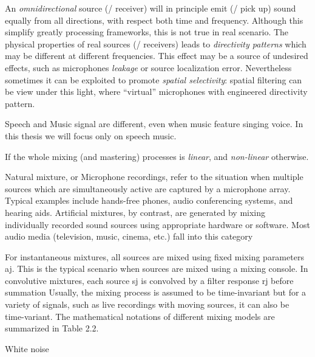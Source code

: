An \textit{omnidirectional} source (\resp/ receiver) will in principle emit (\resp/ pick up) sound equally from all directions,
with respect both time and frequency.
Although this simplify greatly processing frameworks, this is not true in real scenario.
The physical properties of real sources (\resp/ receivers) leads to \textit{directivity patterns} which may
be different at different frequencies.
This effect may be a source of undesired effects, such as microphones \textit{leakage} or source localization error.
Nevertheless sometimes it can be exploited to promote \textit{spatial selectivity}:
spatial filtering can be view under this light, where ``virtual'' microphones with engineered directivity pattern.


Speech and Music signal are different, even when music feature singing voice.
In this thesis we will focus only on speech music.


If the whole mixing (and mastering) processes is \textit{linear}, and \textit{non-linear} otherwise.

Natural mixture, or Microphone recordings, refer to the situation when multiple sources which are simultaneously active are captured by a microphone array.
Typical examples include hands-free phones, audio conferencing systems, and hearing aids.
Artificial mixtures, by contrast, are generated by mixing individually recorded sound sources using appropriate hardware or software. Most audio media (television, music, cinema, etc.) fall into this category

For instantaneous mixtures, all sources are mixed using fixed mixing parameters aj.
This is the typical scenario when sources are mixed using a mixing console.
In convolutive mixtures, each source sj is convolved by a filter response rj before summation
Usually, the mixing process is assumed to be time-invariant but for
a variety of signals, such as live recordings with moving sources, it can also be time-variant. The mathematical notations of different mixing models are summarized in Table 2.2.

White noise


